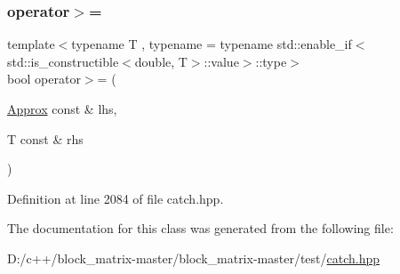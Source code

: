 \subsubsection{\texorpdfstring{operator$>$=}{operator>=}\hspace{0.1cm}{\footnotesize\ttfamily [2/2]}}
{\footnotesize\ttfamily template$<$typename T , typename  = typename std\+::enable\+\_\+if$<$std\+::is\+\_\+constructible$<$double, T$>$\+::value$>$\+::type$>$ \\
bool operator$>$= (\begin{DoxyParamCaption}\item[{\mbox{\hyperlink{class_catch_1_1_detail_1_1_approx}{Approx}} const \&}]{lhs,  }\item[{T const \&}]{rhs }\end{DoxyParamCaption})\hspace{0.3cm}{\ttfamily [friend]}}



Definition at line 2084 of file catch.\+hpp.



The documentation for this class was generated from the following file\+:\begin{DoxyCompactItemize}
\item 
D\+:/c++/block\+\_\+matrix-\/master/block\+\_\+matrix-\/master/test/\mbox{\hyperlink{catch_8hpp}{catch.\+hpp}}\end{DoxyCompactItemize}
